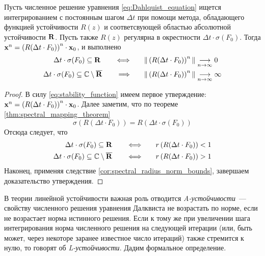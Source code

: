 \begin{statement}
    \label{stat:linear_numerical_stability}
    Пусть численное решение уравнения \eqref{eq:Dahlquist_equation} ищется интегрированием с постоянным шагом $ \Delta t $
    при помощи метода, обладающего функцией устойчивости $ R(z) $ и соответсвующей областью абсолютной устойчивости $ \mathbf{R} $.
    Пусть также $ R(z) $ регулярна в окрестности $ \Delta t \cdot \sigma(F_0) $.
    Тогда $ \mathbf{x}^n = \left( R(\Delta t \cdot F_0) \right)^n \cdot \mathbf{x}_0 $, и выполнено
    \begin{align}
        \Delta t \cdot \sigma(F_0) \subseteq \mathbf{R} \qquad \Longleftrightarrow \qquad & \| \left( R(\Delta t \cdot F_0) \right)^n \| \underset{n \to \infty}{\longrightarrow} 0 \\
        \Delta t \cdot \sigma(F_0) \subseteq \mathbb{C} \setminus \overline{\mathbf{R}} \qquad \Longrightarrow \qquad & \| \left( R(\Delta t \cdot F_0) \right)^n \| \underset{n \to \infty}{\longrightarrow} \infty
    \end{align}
\end{statement}

\begin{proof}
    В силу \eqref{eq:stability_function} имеем первое утверждение: $ \mathbf{x}^n = \left( R(\Delta t \cdot F_0) \right)^n \cdot \mathbf{x}_0 $.
    Далее заметим, что по теореме \ref{thm:spectral_mapping_theorem}
    \[
        \sigma\left( R(\Delta t \cdot F_0) \right) = R\left( \Delta t \cdot \sigma(F_0) \right)
    \]
    Отсюда следует, что
    \begin{align}
        \Delta t \cdot \sigma(F_0) \subseteq \mathbf{R} \qquad \Longleftrightarrow \qquad & r\left( R(\Delta t \cdot F_0) \right) < 1 \\
        \Delta t \cdot \sigma(F_0) \subseteq \mathbb{C} \setminus \overline{\mathbf{R}} \qquad \Longleftrightarrow \qquad & r\left( R(\Delta t \cdot F_0) \right) > 1
    \end{align}
    Наконец, применяя следствие \ref{cor:spectral_radius_norm_bounds}, завершаем доказательство утверждения.
\end{proof}

В теории линейной устойчивости важная роль отводится \emph{A-устойчивости}~--- свойству численного решения уравнения Далквиста не возрастать по норме,
если не возрастает норма истинного решения.
Если к тому же при увеличении шага интегрирования норма численного решения на следующей итерации (или, быть может, через некоторе заранее известное число итераций)
также стремится к нулю, то говорят об \emph{L-устойчивости}.
Дадим формальное определение.

